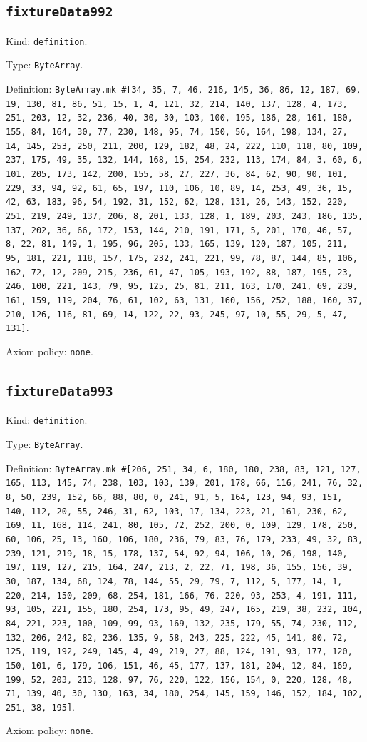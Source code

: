 \documentclass[11pt]{article}
\begin{document}
\subsection*{\texttt{fixtureData992}}
\noindent Kind: \texttt{definition}.\par
\noindent Type: \texttt{ByteArray}.\par
\noindent Definition: \texttt{ByteArray.mk \#[34, 35, 7, 46, 216, 145, 36, 86, 12, 187, 69, 19, 130, 81, 86, 51, 15, 1, 4, 121, 32, 214, 140, 137, 128, 4, 173, 251, 203, 12, 32, 236, 40, 30, 30, 103, 100, 195, 186, 28, 161, 180, 155, 84, 164, 30, 77, 230, 148, 95, 74, 150, 56, 164, 198, 134, 27, 14, 145, 253, 250, 211, 200, 129, 182, 48, 24, 222, 110, 118, 80, 109, 237, 175, 49, 35, 132, 144, 168, 15, 254, 232, 113, 174, 84, 3, 60, 6, 101, 205, 173, 142, 200, 155, 58, 27, 227, 36, 84, 62, 90, 90, 101, 229, 33, 94, 92, 61, 65, 197, 110, 106, 10, 89, 14, 253, 49, 36, 15, 42, 63, 183, 96, 54, 192, 31, 152, 62, 128, 131, 26, 143, 152, 220, 251, 219, 249, 137, 206, 8, 201, 133, 128, 1, 189, 203, 243, 186, 135, 137, 202, 36, 66, 172, 153, 144, 210, 191, 171, 5, 201, 170, 46, 57, 8, 22, 81, 149, 1, 195, 96, 205, 133, 165, 139, 120, 187, 105, 211, 95, 181, 221, 118, 157, 175, 232, 241, 221, 99, 78, 87, 144, 85, 106, 162, 72, 12, 209, 215, 236, 61, 47, 105, 193, 192, 88, 187, 195, 23, 246, 100, 221, 143, 79, 95, 125, 25, 81, 211, 163, 170, 241, 69, 239, 161, 159, 119, 204, 76, 61, 102, 63, 131, 160, 156, 252, 188, 160, 37, 210, 126, 116, 81, 69, 14, 122, 22, 93, 245, 97, 10, 55, 29, 5, 47, 131]}.\par
\noindent Axiom policy: \texttt{none}.\par
\subsection*{\texttt{fixtureData993}}
\noindent Kind: \texttt{definition}.\par
\noindent Type: \texttt{ByteArray}.\par
\noindent Definition: \texttt{ByteArray.mk \#[206, 251, 34, 6, 180, 180, 238, 83, 121, 127, 165, 113, 145, 74, 238, 103, 103, 139, 201, 178, 66, 116, 241, 76, 32, 8, 50, 239, 152, 66, 88, 80, 0, 241, 91, 5, 164, 123, 94, 93, 151, 140, 112, 20, 55, 246, 31, 62, 103, 17, 134, 223, 21, 161, 230, 62, 169, 11, 168, 114, 241, 80, 105, 72, 252, 200, 0, 109, 129, 178, 250, 60, 106, 25, 13, 160, 106, 180, 236, 79, 83, 76, 179, 233, 49, 32, 83, 239, 121, 219, 18, 15, 178, 137, 54, 92, 94, 106, 10, 26, 198, 140, 197, 119, 127, 215, 164, 247, 213, 2, 22, 71, 198, 36, 155, 156, 39, 30, 187, 134, 68, 124, 78, 144, 55, 29, 79, 7, 112, 5, 177, 14, 1, 220, 214, 150, 209, 68, 254, 181, 166, 76, 220, 93, 253, 4, 191, 111, 93, 105, 221, 155, 180, 254, 173, 95, 49, 247, 165, 219, 38, 232, 104, 84, 221, 223, 100, 109, 99, 93, 169, 132, 235, 179, 55, 74, 230, 112, 132, 206, 242, 82, 236, 135, 9, 58, 243, 225, 222, 45, 141, 80, 72, 125, 119, 192, 249, 145, 4, 49, 219, 27, 88, 124, 191, 93, 177, 120, 150, 101, 6, 179, 106, 151, 46, 45, 177, 137, 181, 204, 12, 84, 169, 199, 52, 203, 213, 128, 97, 76, 220, 122, 156, 154, 0, 220, 128, 48, 71, 139, 40, 30, 130, 163, 34, 180, 254, 145, 159, 146, 152, 184, 102, 251, 38, 195]}.\par
\noindent Axiom policy: \texttt{none}.\par
\end{document}
